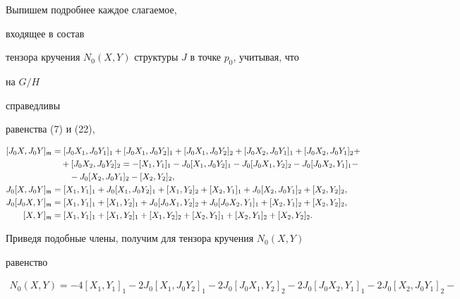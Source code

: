 \begin{pf} Выпишем подробнее каждое слагаемое,


входящее в состав 


тензора кручения $N_0(X,Y)$ структуры $J$ в точке $p_0$, учитывая, что 


на $G/H$ 


справедливы 


равенства (7) и (22), 


\begin{align*} 


[J_0X,J_0Y]_{\frak m}&=[J_0X_1,J_0Y_1]_1+[J_0X_1,J_0Y_2]_1+ 


[J_0X_1,J_0Y_2]_2+[J_0X_2,J_0Y_1]_1+ 


[J_0X_2,J_0Y_1]_2+ \\


&\quad+ [J_0X_2,J_0Y_2]_2=-[X_1,Y_1]_1-J_0[X_1,J_0Y_2]_1-J_0[J_0X_1,Y_2]_2- 


J_0[J_0X_2,Y_1]_1- \\


&\qquad-J_0[X_2,J_0Y_1]_2-[X_2,Y_2]_2,\\ 


% 


J_0[X,J_0Y]_{\frak m}&=[X_1,Y_1]_1+J_0[X_1,J_0Y_2]_1+ 


[X_1,Y_2]_2+[X_2,Y_1]_1+J_0[X_2,J_0Y_1]_2+[X_2,Y_2]_2, \\ 


% 


J_0[J_0X,Y]_{\frak m}&=[X_1,Y_1]_1+[X_1,Y_2]_1+ 


J_0[J_0X_1,Y_2]_2+J_0[J_0X_2,Y_1]_1+ 


[X_2,Y_1]_2+[X_2,Y_2]_2, \\ 


% 


[X,Y]_{\frak m}&=[X_1,Y_1]_1+[X_1,Y_2]_1+[X_1,Y_2]_2+ 


[X_2,Y_1]_1+[X_2,Y_1]_2+[X_2,Y_2]_2. 


\end{align*} 


Приведя подобные члены, получим для тензора кручения $N_0(X,Y)$ 


равенство 


\begin{multline*} 


N_0(X,Y)=-4[X_1,Y_1]_1-2J_0[X_1,J_0Y_2]_1- 


2J_0[J_0X_1,Y_2]_2-2J_0[J_0X_2,Y_1]_1- 


2J_0[X_2,J_0Y_1]_2- \\ 



\end{multline*}
\end{pf}
